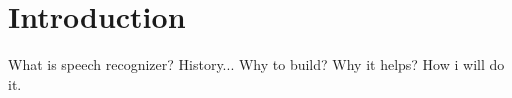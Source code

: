 \chapter{Introduction}

What is speech recognizer?
History...
Why to build?
Why it helps?
How i will do it.
